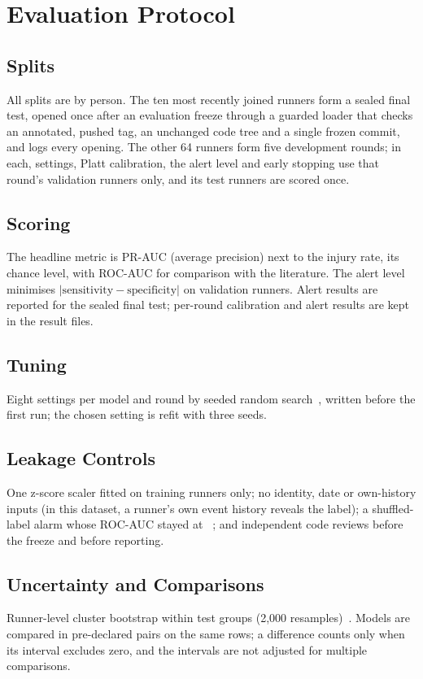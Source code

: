 \documentclass{ieeeaccess}
\begin{document}
\section{Evaluation Protocol}
\subsection{Splits}
All splits are by person. The ten most recently joined runners form a sealed final test, opened
once after an evaluation freeze through a guarded loader that checks an annotated, pushed tag,
an unchanged code tree and a single frozen commit, and logs every opening. The other 64 runners
form five development rounds; in each, settings, Platt calibration, the alert level and early
stopping use that round's validation runners only, and its test runners are scored once.

\subsection{Scoring}
The headline metric is PR-AUC (average precision) next to the injury rate, its chance level,
with ROC-AUC for comparison with the literature. The alert level minimises
$|\mathrm{sensitivity}-\mathrm{specificity}|$ on validation runners. Alert results are reported
for the sealed final test; per-round calibration and alert results are kept in the result files.

\subsection{Tuning}
Eight settings per model and round by seeded random search~\cite{bergstra2012}, written before
the first run; the chosen setting is refit with three seeds.

\subsection{Leakage Controls}
One z-score scaler fitted on training runners only; no identity, date or own-history inputs (in
this dataset, a runner's own event history reveals the label); a shuffled-label alarm whose
ROC-AUC stayed at \canaryAuc{}~\cite{ojala2010}; and independent code reviews before the freeze
and before reporting.

\subsection{Uncertainty and Comparisons}
Runner-level cluster bootstrap within test groups (2,000 resamples)~\cite{field2007}. Models are
compared in pre-declared pairs on the same rows; a difference counts only when its interval
excludes zero, and the intervals are not adjusted for multiple comparisons.
\end{document}
